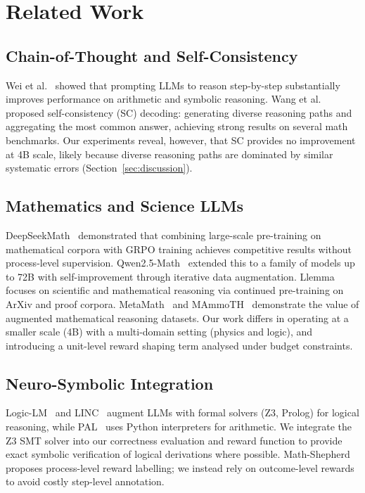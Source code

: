 \documentclass[cmc,journal,article,submit,moreauthors,pdftex]{Definitions/tsp}
\begin{document}
\section{Related Work}\label{sec:related}

\subsection{Chain-of-Thought and Self-Consistency}

Wei et al.~\cite{Wei2022} showed that prompting LLMs to reason
step-by-step substantially improves performance on arithmetic and symbolic
reasoning.
Wang et al.~\cite{Wang2023sc} proposed self-consistency (SC) decoding:
generating diverse reasoning paths and aggregating the most common answer,
achieving strong results on several math benchmarks.
Our experiments reveal, however, that SC provides no improvement at 4B
scale, likely because diverse reasoning paths are dominated by similar
systematic errors (Section~\ref{sec:discussion}).

\subsection{Mathematics and Science LLMs}

DeepSeekMath~\cite{Shao2024} demonstrated that combining large-scale
pre-training on mathematical corpora with GRPO training achieves
competitive results without process-level supervision.
Qwen2.5-Math~\cite{Yang2024} extended this to a family of models up to
72B with self-improvement through iterative data augmentation.
Llemma~\cite{Azerbayev2024} focuses on scientific and mathematical
reasoning via continued pre-training on ArXiv and proof corpora.
MetaMath~\cite{Yu2023} and MAmmoTH~\cite{Yue2023} demonstrate the
value of augmented mathematical reasoning datasets.
Our work differs in operating at a smaller scale (4B) with a multi-domain
setting (physics and logic), and introducing a unit-level reward shaping
term analysed under budget constraints.

\subsection{Neuro-Symbolic Integration}

Logic-LM~\cite{Pan2023} and LINC~\cite{Olausson2023} augment LLMs with
formal solvers (Z3, Prolog) for logical reasoning, while PAL~\cite{Gao2022}
uses Python interpreters for arithmetic.
We integrate the Z3 SMT solver into our correctness evaluation and reward
function to provide exact symbolic verification of logical derivations
where possible.
Math-Shepherd~\cite{Wang2024mathshepherd} proposes process-level reward
labelling; we instead rely on outcome-level rewards to avoid costly
step-level annotation.
\end{document}
